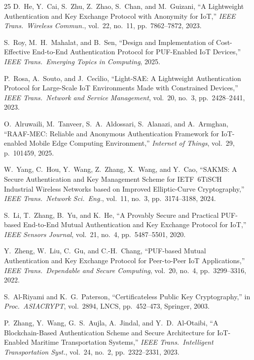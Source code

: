 \documentclass[conference]{IEEEtran}
\begin{document}
\begin{thebibliography}{25}
D.~He, Y.~Cai, S.~Zhu, Z.~Zhao, S.~Chan, and M.~Guizani,
``A Lightweight Authentication and Key Exchange Protocol with Anonymity for
IoT,''
\emph{IEEE Trans.\ Wireless Commun.}, vol.~22, no.~11, pp.~7862--7872, 2023.

S.~Roy, M.~H.~Mahalat, and B.~Sen,
``Design and Implementation of Cost-Effective End-to-End Authentication
Protocol for PUF-Enabled IoT Devices,''
\emph{IEEE Trans.\ Emerging Topics in Computing}, 2025.

P.~Rosa, A.~Souto, and J.~Cec\'{\i}lio,
``Light-SAE: A Lightweight Authentication Protocol for Large-Scale IoT
Environments Made with Constrained Devices,''
\emph{IEEE Trans.\ Network and Service Management}, vol.~20, no.~3,
pp.~2428--2441, 2023.

O.~Alruwaili, M.~Tanveer, S.~A.~Aldossari, S.~Alanazi, and A.~Armghan,
``RAAF-MEC: Reliable and Anonymous Authentication Framework for IoT-enabled
Mobile Edge Computing Environment,''
\emph{Internet of Things}, vol.~29, p.~101459, 2025.


W.~Yang, C.~Hou, Y.~Wang, Z.~Zhang, X.~Wang, and Y.~Cao,
``SAKMS: A Secure Authentication and Key Management Scheme for IETF~6TiSCH
Industrial Wireless Networks based on Improved Elliptic-Curve Cryptography,''
\emph{IEEE Trans.\ Network Sci.\ Eng.}, vol.~11, no.~3, pp.~3174--3188, 2024.

S.~Li, T.~Zhang, B.~Yu, and K.~He,
``A Provably Secure and Practical PUF-based End-to-End Mutual Authentication
and Key Exchange Protocol for IoT,''
\emph{IEEE Sensors Journal}, vol.~21, no.~4, pp.~5487--5501, 2020.

Y.~Zheng, W.~Liu, C.~Gu, and C.-H.~Chang,
``PUF-based Mutual Authentication and Key Exchange Protocol for Peer-to-Peer
IoT Applications,''
\emph{IEEE Trans.\ Dependable and Secure Computing}, vol.~20, no.~4,
pp.~3299--3316, 2022.


S.~Al-Riyami and K.~G.~Paterson,
``Certificateless Public Key Cryptography,''
in \emph{Proc.\ ASIACRYPT}, vol.~2894, LNCS, pp.~452--473, Springer, 2003.

P.~Zhang, Y.~Wang, G.~S.~Aujla, A.~Jindal, and Y.~D.~Al-Otaibi,
``A Blockchain-Based Authentication Scheme and Secure Architecture for
IoT-Enabled Maritime Transportation Systems,''
\emph{IEEE Trans.\ Intelligent Transportation Syst.}, vol.~24, no.~2,
pp.~2322--2331, 2023.


\end{thebibliography}
\end{document}
